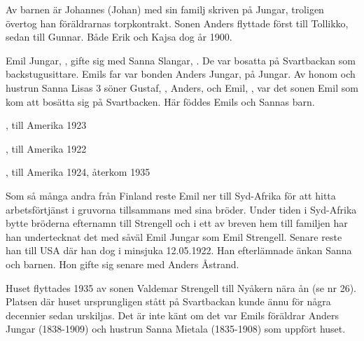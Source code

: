 Av barnen är Johannes (Johan) med sin familj skriven på Jungar, troligen övertog han föräldrarnas torpkontrakt. Sonen Anders flyttade först till Tollikko, sedan till Gunnar. Både Erik och Kajsa dog år 1900.





Emil Jungar, ,  gifte sig med Sanna Slangar, . De var bosatta på Svartbackan som backstugusittare. Emils far var bonden Anders Jungar,  på Jungar. Av honom och hustrun Sanna Lisas 3 söner Gustaf, , Anders,  och Emil, , var det sonen Emil som kom att bosätta sig på Svartbacken. Här föddes Emils och Sannas barn.
\begin{jhchildren}
  \item {}, till Amerika 1923
  \item {}, till Amerika 1922
  \item {}, till Amerika 1924, återkom 1935
\end{jhchildren}

Som så många andra från Finland reste Emil ner till Syd-Afrika för att hitta arbetsförtjänst i gruvorna tillsammans med sina bröder. Under tiden i Syd-Afrika bytte bröderna efternamn till Strengell och i ett av   breven hem till familjen har han undertecknat det med såväl Emil Jungar som Emil Strengell. Senare reste han till USA där han dog i  minsjuka 12.05.1922. Han efterlämnade änkan Sanna och barnen. Hon gifte sig senare med Anders Åstrand.

Huset flyttades 1935 av sonen Valdemar Strengell till Nyåkern nära ån (se nr 26). Platsen där huset ursprungligen stått på Svartbackan kunde ännu för några decennier sedan urskiljas. Det är inte känt om det var Emils föräldrar Anders Jungar (1838-1909) och hustrun Sanna \textborn Mietala (1835-1908) som uppfört huset.
